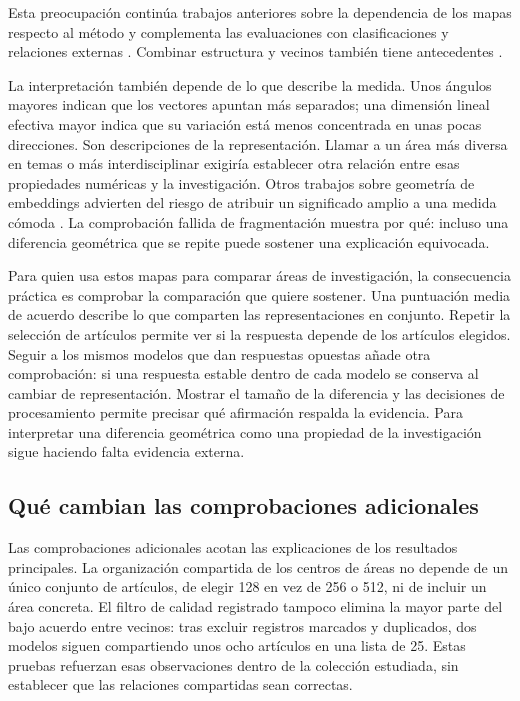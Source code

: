 \documentclass[12pt]{article}
\begin{document}
Esta preocupación continúa trabajos anteriores sobre la dependencia de los mapas respecto al método \citep{refa0d2d707e6,ref6a2f5912bc} y complementa las evaluaciones con clasificaciones y relaciones externas \citep{refbe130e2973,refc0e2cc29e0}. Combinar estructura y vecinos también tiene antecedentes \citep{ref4e1e0d5582}.

La interpretación también depende de lo que describe la medida. Unos ángulos mayores indican que los vectores apuntan más separados; una dimensión lineal efectiva mayor indica que su variación está menos concentrada en unas pocas direcciones. Son descripciones de la representación. Llamar a un área más diversa en temas o más interdisciplinar exigiría establecer otra relación entre esas propiedades numéricas y la investigación. Otros trabajos sobre geometría de embeddings advierten del riesgo de atribuir un significado amplio a una medida cómoda \citep{rudman-etal-2022-isoscore}. La comprobación fallida de fragmentación muestra por qué: incluso una diferencia geométrica que se repite puede sostener una explicación equivocada.

Para quien usa estos mapas para comparar áreas de investigación, la consecuencia práctica es comprobar la comparación que quiere sostener. Una puntuación media de acuerdo describe lo que comparten las representaciones en conjunto. Repetir la selección de artículos permite ver si la respuesta depende de los artículos elegidos. Seguir a los mismos modelos que dan respuestas opuestas añade otra comprobación: si una respuesta estable dentro de cada modelo se conserva al cambiar de representación. Mostrar el tamaño de la diferencia y las decisiones de procesamiento permite precisar qué afirmación respalda la evidencia. Para interpretar una diferencia geométrica como una propiedad de la investigación sigue haciendo falta evidencia externa.

\subsection{Qué cambian las comprobaciones adicionales}
Las comprobaciones adicionales acotan las explicaciones de los resultados principales. La organización compartida de los centros de áreas no depende de un único conjunto de artículos, de elegir 128 en vez de 256 o 512, ni de incluir un área concreta. El filtro de calidad registrado tampoco elimina la mayor parte del bajo acuerdo entre vecinos: tras excluir registros marcados y duplicados, dos modelos siguen compartiendo unos ocho artículos en una lista de 25. Estas pruebas refuerzan esas observaciones dentro de la colección estudiada, sin establecer que las relaciones compartidas sean correctas.
\end{document}

